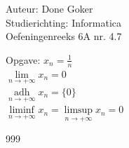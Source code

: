 \documentclass[a4paper]{article}
\begin{document}
  
\noindent \large Auteur: Done Goker \\
\noindent \large Studierichting: Informatica\\
\noindent \large Oefeningenreeks 6A nr. 4.7\\

\medskip

\normalsize

Opgave: $x_n = \frac{1}{n}$ \\

$\lim\limits_{n \rightarrow +\infty} x_n = 0$ \\

$\operatorname*{adh}\limits_{n \rightarrow +\infty} x_n = \{ 0 \}$ \\

$\liminf\limits_{n \rightarrow +\infty} x_n = \limsup\limits_{n \rightarrow +\infty} x_n = 0$ \\

\begin{thebibliography}{999}
\end{thebibliography}
\end{document}

